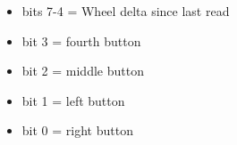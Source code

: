 \begin{itemize}
\item[] bits 7-4 = Wheel delta since last read
\item[] bit 3 = fourth button
\item[] bit 2 = middle button
\item[] bit 1 = left button
\item[] bit 0 = right button
\end{itemize}


